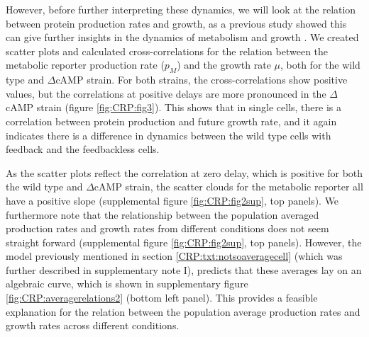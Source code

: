 However, before further interpreting these dynamics, 
we will look at the relation between protein production rates and growth, 
as a previous study showed this can give further insights in the dynamics of metabolism and growth \cite{Kiviet2014}.
%
%
%
%
We created scatter plots and calculated cross-correlations for
the relation between the metabolic reporter production rate ($p_M$) and the growth rate $\mu$,
both for the wild type and $\Delta$cAMP strain.
%
For both strains, the cross-correlations show positive values, 
but the correlations at positive delays are more pronounced in the $\Delta$cAMP strain (figure \ref{fig:CRP:fig3}).
%
This shows that in single cells, there is a correlation between protein production and future growth rate,
and it again
indicates there is a difference in dynamics between the wild type cells with feedback and the feedbackless cells.

As the scatter plots reflect the correlation at zero delay,
which is positive for both the wild type and $\Delta$cAMP strain,
the scatter clouds for the metabolic reporter all have a positive slope (supplemental figure \ref{fig:CRP:fig2sup}, top panels).
%
We furthermore note that the relationship between the population averaged production rates and growth rates from different conditions does not seem straight forward (supplemental figure \ref{fig:CRP:fig2sup}, top panels).
%
However, the model previously mentioned in section \ref{CRP:txt:notsoaveragecell} (which was further described in supplementary note I),
predicts that these averages lay on an algebraic curve, which is shown in supplementary figure \ref{fig:CRP:averagerelations2} (bottom left panel).
%
This provides a feasible explanation for the relation between the population average production rates and growth rates across different conditions.



